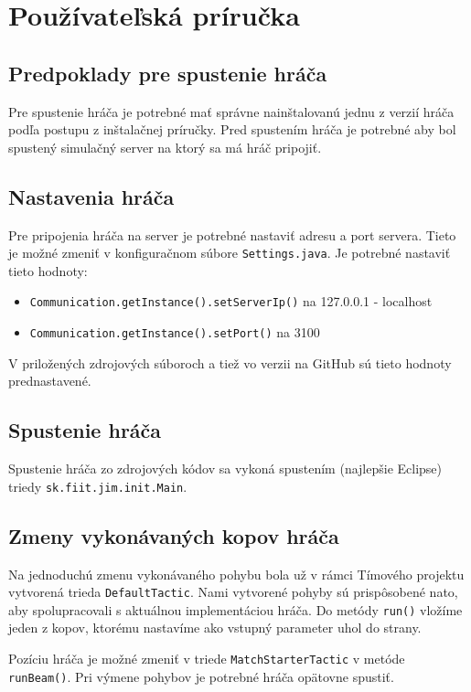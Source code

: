 \section{Používateľská príručka}

\subsection{Predpoklady pre spustenie hráča}
Pre spustenie hráča je potrebné mať správne nainštalovanú jednu z verzií hráča
podľa postupu z inštalačnej príručky. Pred spustením hráča je potrebné aby bol spustený simulačný server na ktorý sa má hráč pripojiť.

\subsection{Nastavenia hráča}

Pre pripojenia hráča na server je potrebné nastaviť adresu a port servera. Tieto je
možné zmeniť v konfiguračnom súbore \texttt{Settings.java}. Je potrebné nastaviť tieto hodnoty:
\begin{itemize}
	\item \texttt{Communication.getInstance().setServerIp()} na 127.0.0.1 - localhost
	\item \texttt{Communication.getInstance().setPort()} na 3100
\end{itemize}

V priložených zdrojových súboroch a tiež vo verzii na GitHub sú tieto hodnoty prednastavené.

\subsection{Spustenie hráča} \label{sec_ap_run}
Spustenie hráča zo zdrojových kódov sa vykoná spustením (najlepšie Eclipse) triedy \texttt{sk.fiit.jim.init.Main}.

\subsection{Zmeny vykonávaných kopov hráča}

Na jednoduchú zmenu vykonávaného pohybu bola už v rámci Tímového projektu vytvorená trieda \texttt{DefaultTactic}. Nami vytvorené pohyby sú prispôsobené nato, aby spolupracovali s aktuálnou implementáciou hráča. Do metódy \texttt{run()} vložíme jeden z kopov, ktorému nastavíme ako vstupný parameter uhol do strany.

Pozíciu hráča je možné zmeniť v triede \texttt{MatchStarterTactic} v metóde \texttt{runBeam()}. Pri výmene pohybov je potrebné hráča opätovne spustiť.